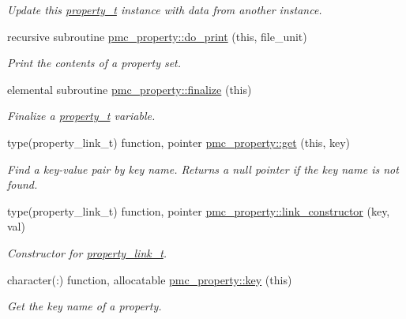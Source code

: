 \begin{DoxyCompactItemize}
\begin{DoxyCompactList}\small\item\em Update this \mbox{\hyperlink{structpmc__property_1_1property__t}{property\+\_\+t}} instance with data from another instance. \end{DoxyCompactList}\item 
recursive subroutine \mbox{\hyperlink{namespacepmc__property_a3f735ac876b8ed0ecd03cc71febb3b66}{pmc\+\_\+property\+::do\+\_\+print}} (this, file\+\_\+unit)
\begin{DoxyCompactList}\small\item\em Print the contents of a property set. \end{DoxyCompactList}\item 
elemental subroutine \mbox{\hyperlink{namespacepmc__property_a434f27f2ad31e1c571f3a6cef3473a21}{pmc\+\_\+property\+::finalize}} (this)
\begin{DoxyCompactList}\small\item\em Finalize a \mbox{\hyperlink{structpmc__property_1_1property__t}{property\+\_\+t}} variable. \end{DoxyCompactList}\item 
type(property\+\_\+link\+\_\+t) function, pointer \mbox{\hyperlink{namespacepmc__property_a97d2c3b608eb3421a39442dc9887284e}{pmc\+\_\+property\+::get}} (this, key)
\begin{DoxyCompactList}\small\item\em Find a key-\/value pair by key name. Returns a null pointer if the key name is not found. \end{DoxyCompactList}\item 
type(property\+\_\+link\+\_\+t) function, pointer \mbox{\hyperlink{namespacepmc__property_ae7d2bacf90850cee9df295d660cd7e0d}{pmc\+\_\+property\+::link\+\_\+constructor}} (key, val)
\begin{DoxyCompactList}\small\item\em Constructor for \mbox{\hyperlink{structpmc__property_1_1property__link__t}{property\+\_\+link\+\_\+t}}. \end{DoxyCompactList}\item 
character(\+:) function, allocatable \mbox{\hyperlink{namespacepmc__property_a733aef8cbd02fbfed19bde913728678e}{pmc\+\_\+property\+::key}} (this)
\begin{DoxyCompactList}\small\item\em Get the key name of a property. \end{DoxyCompactList}\item 

\end{DoxyCompactItemize}
